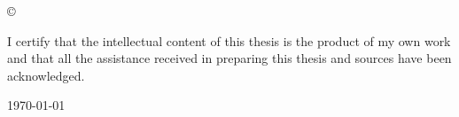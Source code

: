 
\vspace*{14cm}
\begin{center}
  \makeatletter
  \copyright\ \@author
  \makeatother
\end{center}
\noindent
\begin{center}
  \aboutthesis
\end{center}
\noindent

\newpage

\vspace*{7cm}
\begin{center}
  I certify that the intellectual content of this thesis is the
  product of my own work and that all the assistance received in
  preparing this thesis and sources have been acknowledged.
\end{center}

\vspace*{4cm}

\hspace{8cm}\makeatletter\@author\makeatother\par
\hspace{8cm}\today


